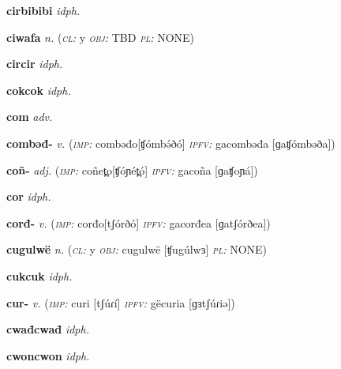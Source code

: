 \newentry
\headword\textbf{cirbibibi} 
\synpos\textit{idph.} 

\newentry
\headword\textbf{ciwafa} 
\ipa{[tʃiwáfa]} 
\synpos\textit{n.} 
\class(\textit{\textsc{cl:}} {y}
\object\textit{\textsc{obj:}} TBD
\plural\textit{\textsc{pl:}} NONE)

\newentry
\headword\textbf{circir} 
\ipa{[tʃirtʃir]} 
\synpos\textit{idph.} 

\newentry
\headword\textbf{cokcok} 
\synpos\textit{idph.} 

\newentry
\headword\textbf{com} 
\ipa{[tʃom]} 
\synpos\textit{adv.} 

\newentry
\headword\textbf{combəđ-}
\synpos\textit{v.} 
\imperative(\textit {\textsc{imp:}} combəđo[ʧómbə́ðó] 
\imperfective\textit{\textsc{ipfv:}} gacombəđa [ɡaʧómbəða])

\newentry
\headword\textbf{coñ-}
\ipa{[tʃoɲ-]}
\synpos\textit{adj.} 
\imperative(\textit {\textsc{imp:}} coñet̪o[ʧóɲét̪ó] 
\imperfective\textit{\textsc{ipfv:}} gacoña [ɡaʧoɲá])

\newentry
\headword\textbf{cor}
\ipa{[tʃorrr]}
\synpos\textit{idph.} 

\newentry
\headword\textbf{corđ-}
\ipa{[tʃórð-]}
\synpos\textit{v.} 
\imperative(\textit {\textsc{imp:}} corđo[tʃórðó] 
\imperfective\textit{\textsc{ipfv:}} gacorđea [ɡatʃórðea])

\newentry
\headword\textbf{cugulwë} 
\synpos\textit{n.} 
\class(\textit{\textsc{cl:}} {y}
\object\textit{\textsc{obj:}} cugulwë [ʧugúlwɜ]
\plural\textit{\textsc{pl:}} NONE)

\newentry
\headword\textbf{cukcuk}
\ipa{[tʃuktʃuk]}
\synpos\textit{idph.} 

\newentry
\headword\textbf{cur-}
\ipa{[tʃúɾ-]}
\synpos\textit{v.} 
\imperative(\textit {\textsc{imp:}} curi [tʃúɾí] 
\imperfective\textit{\textsc{ipfv:}} gëcuria [ɡɜtʃúɾiə])

\newentry
\headword\textbf{cwađcwađ}
\synpos\textit{idph.} 

\newentry
\headword\textbf{cwoncwon}
\ipa{[tʃwontʃwon]}
\synpos\textit{idph.} 


